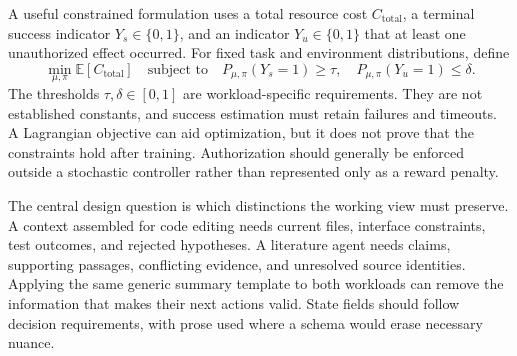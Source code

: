A useful constrained formulation uses a total resource cost $C_{\mathrm{total}}$, a terminal success indicator $Y_s\in\{0,1\}$, and an indicator $Y_u\in\{0,1\}$ that at least one unauthorized effect occurred. For fixed task and environment distributions, define
\begin{equation}
 \min_{\mu,\pi}\mathbb E[C_{\mathrm{total}}]
 \quad\text{subject to}\quad
 P_{\mu,\pi}(Y_s=1)\geq\tau,
 \quad P_{\mu,\pi}(Y_u=1)\leq\delta.
\end{equation}
The thresholds $\tau,\delta\in[0,1]$ are workload-specific requirements. They are not established constants, and success estimation must retain failures and timeouts. A Lagrangian objective can aid optimization, but it does not prove that the constraints hold after training. Authorization should generally be enforced outside a stochastic controller rather than represented only as a reward penalty.

The central design question is which distinctions the working view must preserve. A context assembled for code editing needs current files, interface constraints, test outcomes, and rejected hypotheses. A literature agent needs claims, supporting passages, conflicting evidence, and unresolved source identities. Applying the same generic summary template to both workloads can remove the information that makes their next actions valid. State fields should follow decision requirements, with prose used where a schema would erase necessary nuance.


